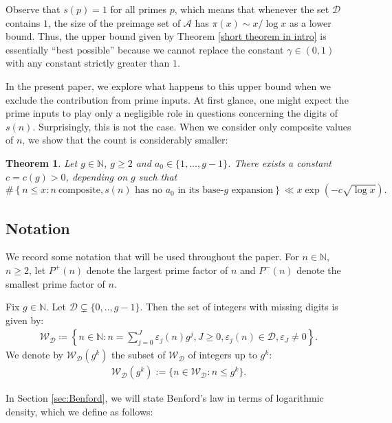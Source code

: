 \documentclass[11pt, reqno]{amsart}
\newtheorem{theorem}{Theorem}
\theoremstyle{remark}
\numberwithin{theorem}{section}
\numberwithin{proposition}{section}
\numberwithin{lemma}{section}
\numberwithin{corollary}{section}
\numberwithin{equation}{section}
\numberwithin{conjecture}{section}
\numberwithin{definition}{section}
\newcommand{\N}{\mathbb{N}}
\begin{document}
Observe that $s(p) = 1$ for all primes $p$, which means that whenever the set $\mathcal{D}$ contains $1$, the size of the preimage set of $\mathcal{A}$ has $\pi(x) \sim x/\log x$ as a lower bound. Thus, the upper bound given by Theorem \ref{short theorem in intro} is essentially ``best possible'' because we cannot replace the constant $\gamma \in (0,1)$ with any constant strictly greater than $1$. 


In the present paper, we explore what happens to this upper bound when we exclude the contribution from prime inputs. At first glance, one might expect the prime inputs to play only a negligible role in questions concerning the digits of $s(n)$. Surprisingly, this is not the case. When we consider only composite values of $n$, we show that the count is considerably smaller:

    
    \begin{theorem}\label{theorem-general}
      Let $g\in\N$, $g\ge 2$ and $a_0\in\{ 1,\ldots , g-1\}$.   There exists a constant $c=c(g)>0$, depending on $g$ such that 
    $$\#\left\{n \leqslant x: n \ \mathrm{composite}, s(n) \text { has no } a_0 \text { in its base-$g$ expansion}\right\}\ll x \exp (-c \sqrt{\log x}).$$   
    \end{theorem}
  

\subsection{Notation}\label{Notation} We record some notation that will be used throughout the paper. For $n\in\mathbb{N}$, $n\geq 2$, let $P^{+}(n)$ denote the largest prime factor of $n$ and $P^{-}(n)$ denote the smallest prime factor of $n$.
 
    
    Fix $g \in \N$. Let $ \mathcal{D} \subsetneq \{ 0,..,g-1\}$. Then the set of integers with missing digits is given by:
     \begin{align*}\label{def:WD}
 \mathcal{W}_{\mathcal{D}}\coloneqq \left\{ n\in\mathbb{N} :  n= \sum_{j=0}^J\varepsilon_j(n) g^j, J \geq 0,  \varepsilon_j(n)\in\mathcal{D}, \varepsilon_J \neq 0\right\}. 
 \end{align*}
We denote by $\mathcal{W}_{\mathcal{D}}(g^k)$ the subset of  $\mathcal{W}_{\mathcal{D}}$ of integers up to $g^k$:
\begin{align*}
    \mathcal{W}_{\mathcal{D}}(g^k):= \{ n \in \mathcal{W}_{\mathcal{D}}: n \leq g^k\}.
\end{align*}

In Section \ref{sec:Benford}, we will state Benford's law in terms of logarithmic density, which we define as follows:
\end{document}
